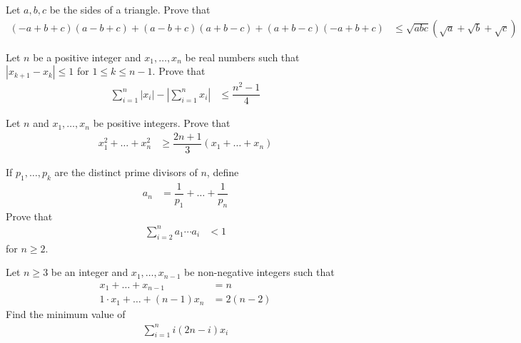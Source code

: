 \documentclass{subfile}
\begin{document}
		\begin{problem}
			Let $a,b,c$ be the sides of a triangle. Prove that
				\begin{align*}
					(-a+b+c)(a-b+c)+(a-b+c)(a+b-c)+(a+b-c)(-a+b+c)
						& \leq \sqrt{abc}(\sqrt{a}+\sqrt{b}+\sqrt{c})
				\end{align*}
		\end{problem}
	
		\begin{problem}
			Let $n$ be a positive integer and $x_{1},\ldots,x_{n}$ be real numbers such that $|x_{k+1}-x_{k}|\leq 1$ for $1\leq k\leq n-1$. Prove that
				\begin{align*}
					\sum_{i=1}^{n}|x_{i}|-\left|\sum_{i=1}^{n}x_{i}\right|
						& \leq \dfrac{n^{2}-1}{4}
				\end{align*}
		\end{problem}
	
		\begin{problem}
			Let $n$ and $x_{1},\ldots,x_{n}$ be positive integers. Prove that
				\begin{align*}
					x_{1}^{2}+\ldots+x_{n}^{2}
						& \geq \dfrac{2n+1}{3}(x_{1}+\ldots+x_{n})
				\end{align*}
		\end{problem}
	
		\begin{problem}
			If $p_{1},\ldots,p_{k}$ are the distinct prime divisors of $n$, define
				\begin{align*}
					a_{n}
						& = \dfrac{1}{p_1}+\ldots+\dfrac{1}{p_{n}}
				\end{align*}
			Prove that
				\begin{align*}
					\sum_{i=2}^{n}a_{1}\cdots a_{i}
						& < 1
				\end{align*}
			for $n\geq 2$.
		\end{problem}
	
		\begin{problem}
			Let $n\geq 3$ be an integer and $x_{1},\ldots,x_{n-1}$ be non-negative integers such that
				\begin{align*}
					x_{1}+\ldots+x_{n-1}
						& = n\\
					1\cdot x_{1}+\ldots+(n-1)x_{n}
						& = 2(n-2)
				\end{align*}
			Find the minimum value of
				\begin{align*}
					\sum_{i=1}^{n}i(2n-i)x_{i}
				\end{align*}
		\end{problem}
	
\end{document}
